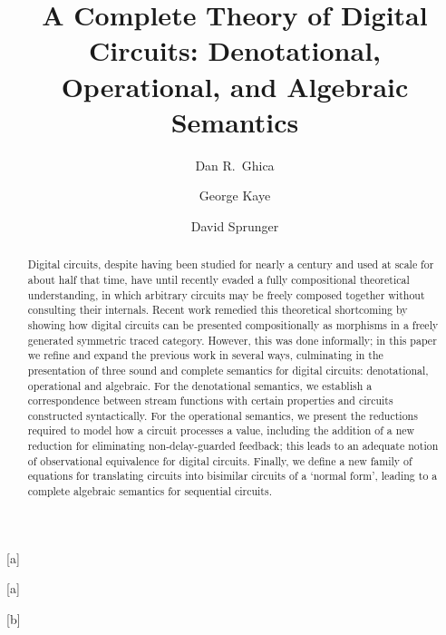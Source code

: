 \documentclass{lmcs}
\begin{document}
\title[A Complete Theory of Digital Circuits]{%
    A Complete Theory of Digital Circuits: %
    Denotational, Operational, and Algebraic Semantics}%


\author[D.R.~Ghica]{Dan R.\ Ghica}[a]
\author[G.~Kaye]{George Kaye}[a]
\author[D.~Sprunger]{David Sprunger}[b]


\address{University of Birmingham}

\address{Indiana State University}

\begin{abstract}
    Digital circuits, despite having been studied for nearly a century and used
    at scale for about half that time, have until recently evaded a fully
    compositional theoretical understanding, in which arbitrary circuits may be
    freely composed together without consulting their internals.
    Recent work remedied this theoretical shortcoming by showing how digital
    circuits can be presented compositionally as morphisms in a freely generated
    symmetric traced category.
    However, this was done informally; in this paper we refine and expand the
    previous work in several ways, culminating in the presentation of three
    sound and complete semantics for digital circuits: denotational, operational
    and algebraic.
    For the denotational semantics, we establish a correspondence between
    stream functions with certain properties and circuits constructed
    syntactically.
    For the operational semantics, we present the reductions required to model
    how a circuit processes a value, including the addition of a new reduction
    for eliminating non-delay-guarded feedback; this leads to an adequate notion
    of observational equivalence for digital circuits.
    Finally, we define a new family of equations for translating circuits into
    bisimilar circuits of a `normal form', leading to a complete algebraic
    semantics for sequential circuits.
\end{abstract}

\maketitle
\end{document}
